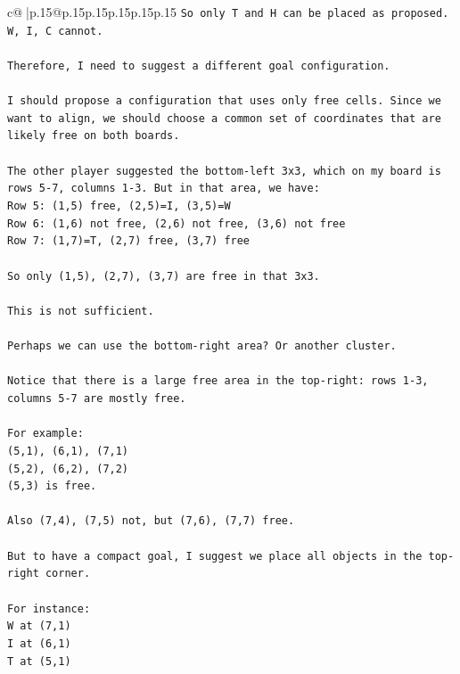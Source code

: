 \documentclass{article}
\begin{document}
{\begin{supertabular}{c@{$\;$}|p{.15\linewidth}@{}p{.15\linewidth}p{.15\linewidth}p{.15\linewidth}p{.15\linewidth}p{.15\linewidth}}
{{{\texttt{So only T and H can be placed as proposed. W, I, C cannot.} \\
\\ 
\texttt{Therefore, I need to suggest a different goal configuration.} \\
\\ 
\texttt{I should propose a configuration that uses only free cells. Since we want to align, we should choose a common set of coordinates that are likely free on both boards.} \\
\\ 
\texttt{The other player suggested the bottom{-}left 3x3, which on my board is rows 5{-}7, columns 1{-}3. But in that area, we have:} \\
\texttt{Row 5: (1,5) free, (2,5)=I, (3,5)=W} \\
\texttt{Row 6: (1,6) not free, (2,6) not free, (3,6) not free} \\
\texttt{Row 7: (1,7)=T, (2,7) free, (3,7) free} \\
\\ 
\texttt{So only (1,5), (2,7), (3,7) are free in that 3x3.} \\
\\ 
\texttt{This is not sufficient.} \\
\\ 
\texttt{Perhaps we can use the bottom{-}right area? Or another cluster.} \\
\\ 
\texttt{Notice that there is a large free area in the top{-}right: rows 1{-}3, columns 5{-}7 are mostly free.} \\
\\ 
\texttt{For example:} \\
\texttt{(5,1), (6,1), (7,1)} \\
\texttt{(5,2), (6,2), (7,2)} \\
\texttt{(5,3) is free.} \\
\\ 
\texttt{Also (7,4), (7,5) not, but (7,6), (7,7) free.} \\
\\ 
\texttt{But to have a compact goal, I suggest we place all objects in the top{-}right corner.} \\
\\ 
\texttt{For instance:} \\
\texttt{W at (7,1)} \\
\texttt{I at (6,1)} \\
\texttt{T at (5,1)} \\
}}}
\end{supertabular}}
\end{document}
